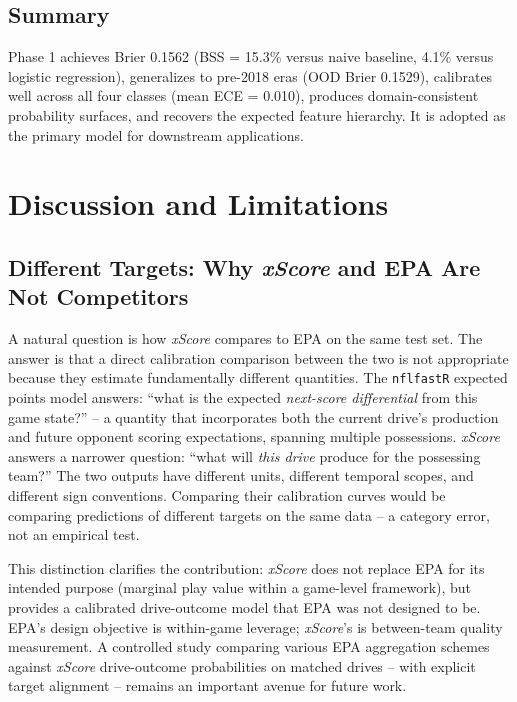 \documentclass[12pt,a4paper]{article}
\newcommand{\xscore}{\textit{xScore}}
\begin{document}
\subsection{Summary}

Phase 1 achieves Brier 0.1562 (BSS = 15.3\% versus naive baseline, 4.1\% versus logistic regression), generalizes to pre-2018 eras (OOD Brier 0.1529), calibrates well across all four classes (mean ECE = 0.010), produces domain-consistent probability surfaces, and recovers the expected feature hierarchy. It is adopted as the primary model for downstream applications.

\section{Discussion and Limitations}
\label{sec:discussion}

\subsection{Different Targets: Why \xscore{} and EPA Are Not Competitors}

A natural question is how \xscore{} compares to EPA on the same test set. The answer is that a direct calibration comparison between the two is not appropriate because they estimate fundamentally different quantities. The \texttt{nflfastR} expected points model answers: ``what is the expected \emph{next-score differential} from this game state?'' -- a quantity that incorporates both the current drive's production and future opponent scoring expectations, spanning multiple possessions. \xscore{} answers a narrower question: ``what will \emph{this drive} produce for the possessing team?'' The two outputs have different units, different temporal scopes, and different sign conventions. Comparing their calibration curves would be comparing predictions of different targets on the same data -- a category error, not an empirical test.

This distinction clarifies the contribution: \xscore{} does not replace EPA for its intended purpose (marginal play value within a game-level framework), but provides a calibrated drive-outcome model that EPA was not designed to be. EPA's design objective is within-game leverage; \xscore{}'s is between-team quality measurement. A controlled study comparing various EPA aggregation schemes against \xscore{} drive-outcome probabilities on matched drives -- with explicit target alignment -- remains an important avenue for future work.
\end{document}
